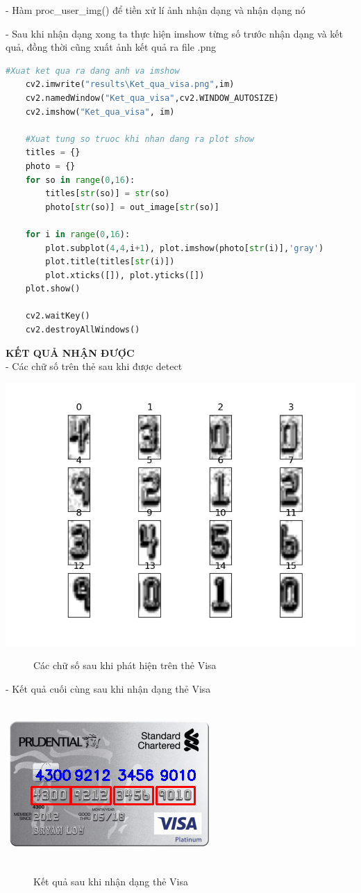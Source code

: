 - Hàm proc\_user\_img() để tiền xử lí ảnh nhận dạng và nhận dạng nó

- Sau khi nhận dạng xong ta thực hiện imshow từng số trước nhận dạng và kết quả, đồng thời cũng xuất ảnh kết quả ra file .png
\begin{lstlisting}[language=Python]
    #Xuat ket qua ra dang anh va imshow
    cv2.imwrite("results\Ket_qua_visa.png",im)
    cv2.namedWindow("Ket_qua_visa",cv2.WINDOW_AUTOSIZE)
    cv2.imshow("Ket_qua_visa", im)    

    #Xuat tung so truoc khi nhan dang ra plot show
    titles = {}
    photo = {}
    for so in range(0,16):		
        titles[str(so)] = str(so)
        photo[str(so)] = out_image[str(so)]

    for i in range(0,16):
	    plot.subplot(4,4,i+1), plot.imshow(photo[str(i)],'gray')
	    plot.title(titles[str(i)])
	    plot.xticks([]), plot.yticks([])
    plot.show()
    
    cv2.waitKey() 
    cv2.destroyAllWindows()          
\end{lstlisting}

\quad \textbf{KẾT QUẢ NHẬN ĐƯỢC} \\[0.2cm]

- Các chữ số trên thẻ sau khi được detect 

\includegraphics[]{images/visa/digits.png}

\begin{figure}[htp!]
    \caption{Các chữ số sau khi phát hiện trên thẻ Visa}
\end{figure}

- Kết quả cuối cùng sau khi nhận dạng thẻ Visa
\begin{center}
    \includegraphics[]{images/visa/ket_qua_visa.png}
\end{center}

\begin{figure}[htp!]
    \caption{Kết quả sau khi nhận dạng thẻ Visa}
\end{figure}